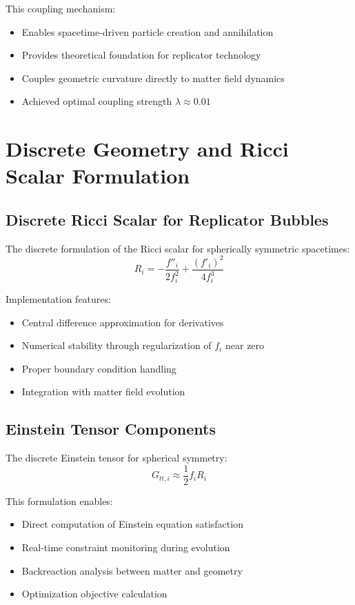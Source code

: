 \documentclass[11pt]{article}
\begin{document}
This coupling mechanism:
\begin{itemize}
\item Enables spacetime-driven particle creation and annihilation
\item Provides theoretical foundation for replicator technology
\item Couples geometric curvature directly to matter field dynamics
\item Achieved optimal coupling strength $\lambda \approx 0.01$
\end{itemize}

\section{Discrete Geometry and Ricci Scalar Formulation}

\subsection{Discrete Ricci Scalar for Replicator Bubbles}

The discrete formulation of the Ricci scalar for spherically symmetric spacetimes:
\begin{equation}
R_i = -\frac{f''_i}{2f_i^2} + \frac{(f'_i)^2}{4f_i^3}
\end{equation}

Implementation features:
\begin{itemize}
\item Central difference approximation for derivatives
\item Numerical stability through regularization of $f_i$ near zero
\item Proper boundary condition handling
\item Integration with matter field evolution
\end{itemize}

\subsection{Einstein Tensor Components}

The discrete Einstein tensor for spherical symmetry:
\begin{equation}
G_{tt,i} \approx \frac{1}{2}f_i R_i
\end{equation}

This formulation enables:
\begin{itemize}
\item Direct computation of Einstein equation satisfaction
\item Real-time constraint monitoring during evolution
\item Backreaction analysis between matter and geometry
\item Optimization objective calculation
\end{itemize}
\end{document}

